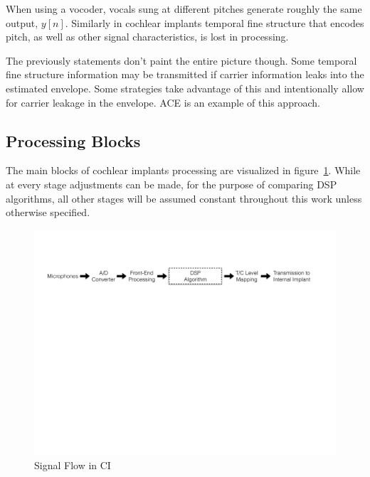 \documentclass [11pt, proquest,oneside] {ganter_thesis}[2015/03/03]
\begin{document}
When using a vocoder, vocals sung at different pitches generate roughly the same output, $y[n]$.  Similarly in cochlear implants temporal fine structure that encodes pitch, as well as other signal characteristics, is lost in processing.

The previously statements don't paint the entire picture though.  Some temporal fine structure information may be transmitted if carrier information leaks into the estimated envelope.  Some strategies take advantage of this and intentionally allow for carrier leakage in the envelope.  ACE is an example of this approach.


\subsection{Processing Blocks}

The main blocks of cochlear implants processing are visualized in figure~\ref{fig:CI_signal_flow}.  While at every stage adjustments can be made, for the purpose of comparing DSP algorithms, all other stages will be assumed constant throughout this work unless otherwise specified.

\begin{figure}[!ht]
  \centering
    \includegraphics[width=1.0\textwidth]{CI_Signal_Flow}   
    \caption{Signal Flow in CI}\label{fig:CI_signal_flow}
\end{figure}
\end{document}
